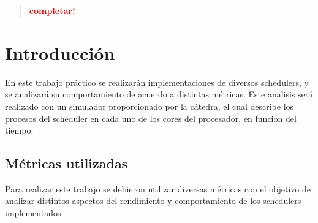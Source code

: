 \documentclass[a4paper]{article}
\begin{document}

\thispagestyle{empty}

\maketitle
\newpage

\thispagestyle{empty}
\vfill
\begin{abstract}
    \vspace{0.5cm}
    \textcolor{red}{\textbf{completar!}}
\end{abstract}

\thispagestyle{empty}
\vspace{1.5cm}
\tableofcontents
\newpage


\newpage

\section{Introducción}
En este trabajo práctico se realizarán implementaciones de diversos
schedulers, y se analizará su comportamiento de acuerdo a distintas
métricas. Este analisis será realizado con un simulador proporcionado por la
cátedra, el cual describe los procesos del scheduler en cada uno de los
cores del procesador, en funcion del tiempo.

\subsection{Métricas utilizadas}
Para realizar este trabajo se debieron utilizar diversas métricas con el
objetivo de analizar distintos aspectos del rendimiento y comportamiento de
los schedulers implementados.
\end{document}
